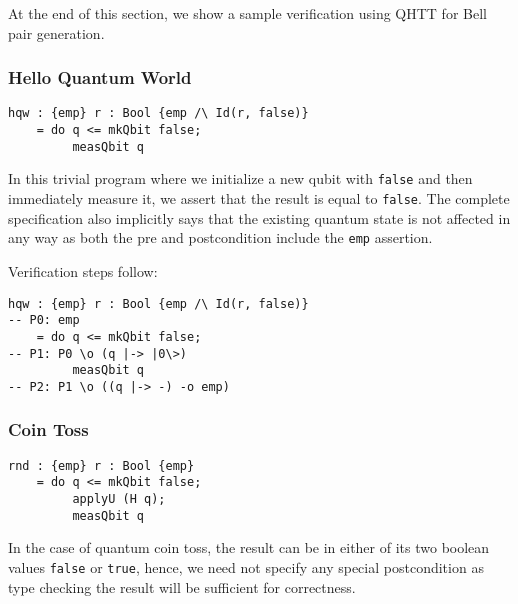 \documentclass[acmsmall,nonacm,timestamp,review=false,anonymous=false]{acmart}
\begin{document}
At the end of this section, we show a sample verification using QHTT for Bell pair generation.

\subsubsection{Hello Quantum World}
\leavevmode

\begin{minipage}{0.95\linewidth}
\begin{lstlisting}[language=QHaskell]
hqw : {emp} r : Bool {emp /\ Id(r, false)}
    = do q <= mkQbit false;
         measQbit q
\end{lstlisting}
\end{minipage}

In this trivial program where we initialize a new qubit with \texttt{false} and then immediately measure it, we assert that the result is equal to \texttt{false}. The complete specification also implicitly says that the existing quantum state is not affected in any way as both the pre and postcondition include the \texttt{emp} assertion.

Verification steps follow:

\begin{minipage}{0.95\linewidth}
\begin{lstlisting}[language=QHaskell]
hqw : {emp} r : Bool {emp /\ Id(r, false)}
-- P0: emp
    = do q <= mkQbit false;
-- P1: P0 \o (q |-> |0\>)
         measQbit q
-- P2: P1 \o ((q |-> -) -o emp)
\end{lstlisting}
\end{minipage}

\subsubsection{Coin Toss}
\leavevmode

\begin{minipage}{0.95\linewidth}
\begin{lstlisting}[language=QHaskell]
rnd : {emp} r : Bool {emp}
    = do q <= mkQbit false;
         applyU (H q);
         measQbit q
\end{lstlisting}
\end{minipage}

In the case of quantum coin toss, the result can be in either of its two boolean values \texttt{false} or \texttt{true}, hence, we need not specify any special postcondition as type checking the result will be sufficient for correctness.
\end{document}
